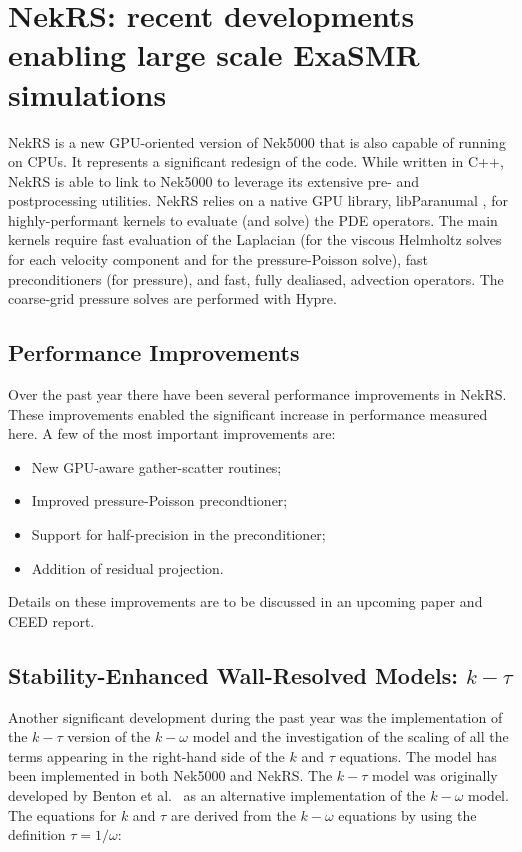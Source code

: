 \section{NekRS: recent developments enabling large scale ExaSMR simulations}
\label{sec:nekrs}

NekRS is a new GPU-oriented version of Nek5000  that is also capable of running
on CPUs. It represents a significant redesign of the code. While written in
C++, NekRS is able to link to Nek5000 to leverage its extensive pre- and
postprocessing utilities. NekRS relies on a native GPU library,
libParanumal \cite{libP}, for highly-performant kernels to evaluate (and
solve) the PDE operators.  The main kernels require fast evaluation of the
Laplacian (for the viscous Helmholtz solves for each velocity component and
for the pressure-Poisson solve), fast preconditioners (for pressure), and
fast, fully dealiased, advection operators.  The coarse-grid pressure solves
are performed with Hypre.

\subsection{Performance Improvements}

Over the past year there have been several performance improvements in NekRS. These improvements enabled the significant increase in performance measured here.
A few of the most important improvements are:
\begin{itemize}
  \item New GPU-aware gather-scatter routines;
  \item Improved pressure-Poisson precondtioner;
  \item Support for half-precision in the preconditioner;
  \item Addition of residual projection.
\end{itemize}
Details on these improvements are to be discussed in an upcoming paper and CEED report.

\subsection{Stability-Enhanced Wall-Resolved Models: $k-\tau$}
Another significant development during the past year was the implementation of the $k-\tau$
version of the $k-\omega$ model and the investigation of the scaling of all the terms appearing in
the right-hand side of the $k$ and $\tau$ equations. The model has been implemented in both Nek5000 and NekRS. The $k-\tau$ model was originally developed by Benton et al.~\cite{benton1996application} as an alternative
implementation of the $k-\omega$ model. The equations for $k$ and $\tau$ are derived from the $k-\omega$
equations by using the definition $\tau=1/\omega$:

